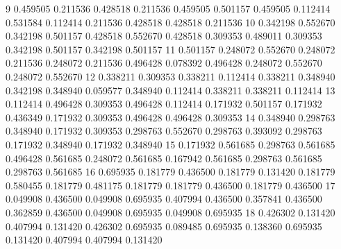 {    9    0.459505     0.211536    0.428518    0.211536              0.459505             0.501157           0.459505             0.112414                0.531584                0.112414               0.211536              0.428518               0.428518                0.211536
   10    0.342198     0.552670    0.342198    0.501157              0.428518             0.552670           0.428518             0.309353                0.489011                0.309353               0.342198              0.501157               0.342198                0.501157
   11    0.501157     0.248072    0.552670    0.248072              0.211536             0.248072           0.211536             0.496428                0.078392                0.496428               0.248072              0.552670               0.248072                0.552670
   12    0.338211     0.309353    0.338211    0.112414              0.338211             0.348940           0.342198             0.348940                0.059577                0.348940               0.112414              0.338211               0.338211                0.112414
   13    0.112414     0.496428    0.309353    0.496428              0.112414             0.171932           0.501157             0.171932                0.436349                0.171932               0.309353              0.496428               0.496428                0.309353
   14    0.348940     0.298763    0.348940    0.171932              0.309353             0.298763           0.552670             0.298763                0.393092                0.298763               0.171932              0.348940               0.171932                0.348940
   15    0.171932     0.561685    0.298763    0.561685              0.496428             0.561685           0.248072             0.561685                0.167942                0.561685               0.298763              0.561685               0.298763                0.561685
   16    0.695935     0.181779    0.436500    0.181779              0.131420             0.181779           0.580455             0.181779                0.481175                0.181779               0.181779              0.436500               0.181779                0.436500
   17    0.049908     0.436500    0.049908    0.695935              0.407994             0.436500           0.357841             0.436500                0.362859                0.436500               0.049908              0.695935               0.049908                0.695935
   18    0.426302     0.131420    0.407994    0.131420              0.426302             0.695935           0.089485             0.695935                0.138360                0.695935               0.131420              0.407994               0.407994                0.131420
}
